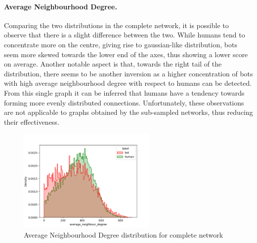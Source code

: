 \documentclass[12pt, a4paper]{article}
\begin{document}
		\paragraph{Average Neighbourhood Degree.} Comparing the two distributions in the complete network, it is possible to observe that there is a slight difference between the two. While humans tend to concentrate more on the centre, giving rise to gaussian-like distribution, bots seem more skewed towards the lower end of the axes, thus showing a lower score on average. Another notable aspect is that, towards the right tail of the distribution, there seems to be another inversion as a higher concentration of bots with high average neighbourhood degree with respect to humans can be detected. From this single graph it can be inferred that humans have a tendency towards forming more evenly distributed connections. Unfortunately, these observations are not applicable to graphs obtained by the sub-sampled networks, thus reducing their effectiveness.
		\begin{figure}[H]
			\centering
            \includegraphics[width=0.6\textwidth]{complete_average_neighbour_degree_distribution.png}
            \caption{Average Neighbourhood Degree distribution for complete network}
        \end{figure}
\end{document}
